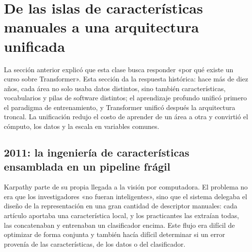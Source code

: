 \section{De las islas de características manuales a una arquitectura unificada}

La sección anterior explicó que esta clase busca responder «por qué existe un curso sobre Transformer». Esta sección da la respuesta histórica: hace más de diez años, cada área no solo usaba datos distintos, sino también características, vocabularios y pilas de software distintos; el aprendizaje profundo unificó primero el paradigma de entrenamiento, y Transformer unificó después la arquitectura troncal. La unificación redujo el costo de aprender de un área a otra y convirtió el cómputo, los datos y la escala en variables comunes.

\subsection{2011: la ingeniería de características ensamblada en un pipeline frágil}

Karpathy parte de su propia llegada a la visión por computadora. El problema no era que los investigadores «no fueran inteligentes», sino que el sistema delegaba el diseño de la representación en una gran cantidad de descriptor manuales: cada artículo aportaba una característica local, y los practicantes las extraían todas, las concatenaban y entrenaban un clasificador encima. Este flujo era difícil de optimizar de forma conjunta y también hacía difícil determinar si un error provenía de las características, de los datos o del clasificador.




